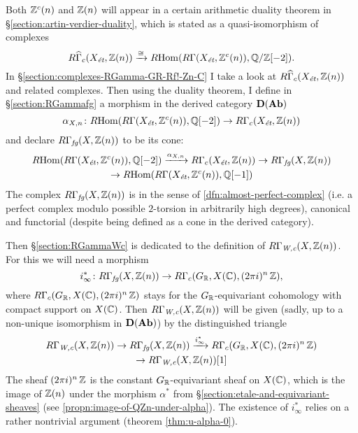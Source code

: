 Both $\mathbb{Z}^c (n)$ and $\mathbb{Z} (n)$ will appear in a certain arithmetic duality
theorem in \S\ref{section:artin-verdier-duality}, which is stated as a
quasi-isomorphism of complexes
\[ R\widehat{\Gamma}_c (X_\text{\it ét}, \mathbb{Z} (n)) \xrightarrow{\cong}
  R\!\operatorname{Hom} (R\Gamma (X_\text{\it ét}, \mathbb{Z}^c (n)), \mathbb{Q}/\mathbb{Z} [-2]). \]
In \S\ref{section:complexes-RGamma-GR-Rf!-Zn-C} I take a look at
$R\widehat{\Gamma}_c (X_\text{\it ét}, \mathbb{Z} (n))$ and related complexes.
Then using the duality theorem, I define in \S\ref{section:RGammafg} a morphism
in the derived category $\text{\bf D} (\text{\bf Ab})$
\[ \alpha_{X,n}\colon
  R\!\operatorname{Hom} (R\Gamma (X_\text{\it ét}, \mathbb{Z}^c (n)), \mathbb{Q} [-2]) \to
  R\Gamma_c (X_\text{\it ét}, \mathbb{Z} (n)) \]
and declare $R\Gamma_\text{\it fg} (X, \mathbb{Z} (n))$ to be its cone:
\begin{multline*}
  R\!\operatorname{Hom} (R\Gamma (X_\text{\it ét}, \mathbb{Z}^c (n)), \mathbb{Q} [-2]) \xrightarrow{\alpha_{X,n}}
  R\Gamma_c (X_\text{\it ét}, \mathbb{Z} (n)) \to
  R\Gamma_\text{\it fg} (X, \mathbb{Z} (n)) \\
  \to R\!\operatorname{Hom} (R\Gamma (X_\text{\it ét}, \mathbb{Z}^c (n)), \mathbb{Q} [-1])
\end{multline*}
The complex $R\Gamma_\text{\it fg} (X, \mathbb{Z} (n))$ is 
in the sense of \ref{dfn:almost-perfect-complex} (i.e. a perfect complex modulo
possible $2$-torsion in arbitrarily high degrees), canonical and functorial
(despite being defined as a cone in the derived category).

Then \S\ref{section:RGammaWc} is dedicated to the definition of
$R\Gamma_\text{\it W,c} (X,\mathbb{Z}(n))$. For this we will need a morphism
\[ i_\infty^*\colon
  R\Gamma_\text{\it fg} (X, \mathbb{Z} (n)) \to
  R\Gamma_c (G_{\mathbb{R}}, X (\mathbb{C}), (2\pi i)^n\,\mathbb{Z}), \]
where $R\Gamma_c (G_{\mathbb{R}}, X (\mathbb{C}), (2\pi i)^n\,\mathbb{Z})$ stays for the
$G_{\mathbb{R}}$-equivariant cohomology with compact support on $X (\mathbb{C})$.
Then $R\Gamma_\text{\it W,c} (X,\mathbb{Z}(n))$ will be given (sadly, up to a
non-unique isomorphism in $\text{\bf D} (\text{\bf Ab})$) by the distinguished
triangle
\begin{multline*}
  R\Gamma_\text{\it W,c} (X,\mathbb{Z}(n)) \to
  R\Gamma_\text{\it fg} (X, \mathbb{Z} (n)) \xrightarrow{i_\infty^*}
  R\Gamma_c (G_{\mathbb{R}}, X (\mathbb{C}), (2\pi i)^n\,\mathbb{Z}) \\
  \to R\Gamma_\text{\it W,c} (X,\mathbb{Z}(n)) [1]
\end{multline*}
The sheaf $(2\pi i)^n \, \mathbb{Z}$ is the constant $G_{\mathbb{R}}$-equivariant sheaf on
$X (\mathbb{C})$, which is the image of $\mathbb{Z} (n)$ under the morphism $\alpha^*$ from
\S\ref{section:etale-and-equivariant-sheaves}
(see \ref{propn:image-of-QZn-under-alpha}). The existence of $i_\infty^*$ relies
on a rather nontrivial argument (theorem \ref{thm:u-alpha-0}).

